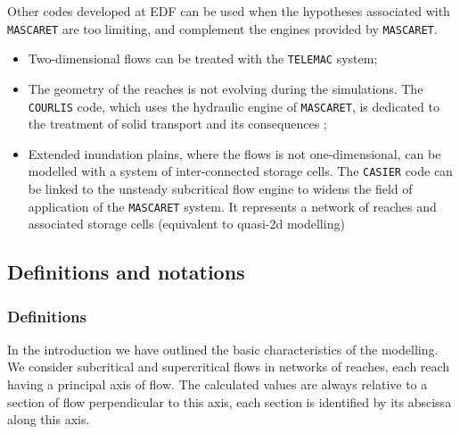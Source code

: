 Other codes developed at EDF can be used when the hypotheses associated with \texttt{MASCARET} are too limiting, and complement the engines provided by \texttt{MASCARET}.
\vspace{0.5cm}
\begin{itemize}
 \item Two-dimensional flows can be treated with the \texttt{TELEMAC} system\cite{HERVOUET07};
 \item The geometry of the reaches is not evolving during the simulations. The \texttt{COURLIS} code, which uses the hydraulic engine of \texttt{MASCARET}, is dedicated to the treatment of solid transport and its consequences ;
 \item Extended inundation plains, where the flows is not one-dimensional, can be modelled with a system of inter-connected storage cells. The \texttt{CASIER} code can be linked to the unsteady subcritical flow engine to widens the field of application of the \texttt{MASCARET} system. It represents a network of reaches and associated storage cells (equivalent to quasi-2d modelling)
\end{itemize}

\subsection{Definitions and notations}

\subsubsection{Definitions} \label{secDef}

In the introduction we have outlined the basic characteristics of the modelling.  We consider subcritical and supercritical flows in networks of reaches, each reach having a principal axis of flow. The calculated values are always relative to a section of flow perpendicular to this axis, each section is identified by its abscissa along this axis.

\vspace{0.5cm}

